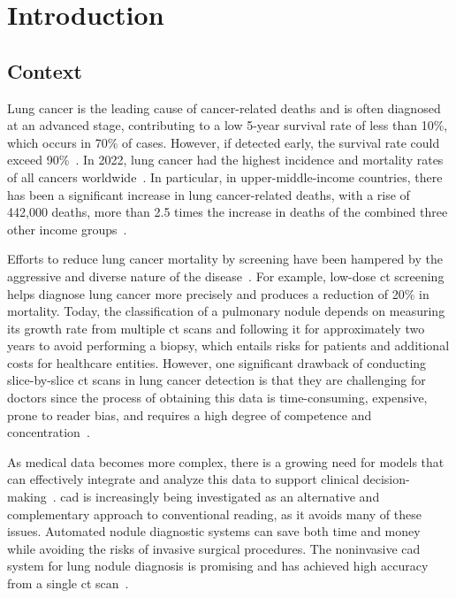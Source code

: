 \chapter{Introduction} \label{chap:intro}


\section{Context} \label{sec:context}

Lung cancer is the leading cause of cancer-related deaths and is often diagnosed at an advanced stage, contributing to a low 5-year survival rate of less than 10\%, which occurs in 70\% of cases. However, if detected early, the survival rate could exceed 90\%~\cite{ning_early_2021}. In 2022, lung cancer had the highest incidence and mortality rates of all cancers worldwide~\cite{international_agency_for_research_on_cancer_trachea_2024}. In particular, in upper-middle-income countries, there has been a significant increase in lung cancer-related deaths, with a rise of 442,000 deaths, more than 2.5 times the increase in deaths of the combined three other income groups~\cite{world_health_organization_top_2024}.

Efforts to reduce lung cancer mortality by screening have been hampered by the aggressive and diverse nature of the disease~\cite{national_lung_screening_trial_research_team_reduced_2011}. For example, low-dose \ac{ct} screening helps diagnose lung cancer more precisely and produces a reduction of 20\% in mortality. Today, the classification of a pulmonary nodule depends on measuring its growth rate from multiple \ac{ct} scans and following it for approximately two years to avoid performing a biopsy, which entails risks for patients and additional costs for healthcare entities. However, one significant drawback of conducting slice-by-slice \ac{ct} scans in lung cancer detection is that they are challenging for doctors since the process of obtaining this data is time-consuming, expensive, prone to reader bias, and requires a high degree of competence and concentration~\cite{shaffie_computer-assisted_2022}.

As medical data becomes more complex, there is a growing need for models that can effectively integrate and analyze this data to support clinical decision-making~\cite{iqbal_fusion_2023}. \ac{cad} is increasingly being investigated as an alternative and complementary approach to conventional reading, as it avoids many of these issues. Automated nodule diagnostic systems can save both time and money while avoiding the risks of invasive surgical procedures. The noninvasive \ac{cad} system for lung nodule diagnosis is promising and has achieved high accuracy from a single \ac{ct} scan~\cite{shaffie_computer-assisted_2022}.

